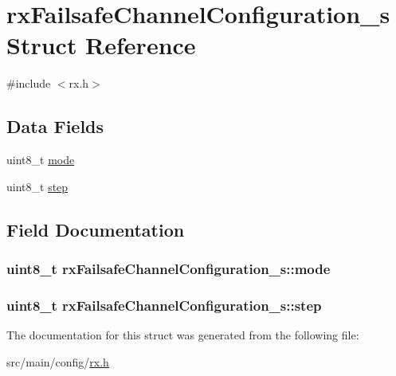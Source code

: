\hypertarget{structrxFailsafeChannelConfiguration__s}{\section{rx\+Failsafe\+Channel\+Configuration\+\_\+s Struct Reference}
\label{structrxFailsafeChannelConfiguration__s}
}


{\ttfamily \#include $<$rx.\+h$>$}

\subsection*{Data Fields}
\begin{DoxyCompactItemize}
\item 
uint8\+\_\+t \hyperlink{structrxFailsafeChannelConfiguration__s_a9d5ef953270de9d92a7bd424d6580b6f}{mode}
\item 
uint8\+\_\+t \hyperlink{structrxFailsafeChannelConfiguration__s_a88eea7a958ac0da378e1f85d0e037f1e}{step}
\end{DoxyCompactItemize}


\subsection{Field Documentation}
\hypertarget{structrxFailsafeChannelConfiguration__s_a9d5ef953270de9d92a7bd424d6580b6f}{
\subsubsection[{mode}]{\setlength{\rightskip}{0pt plus 5cm}uint8\+\_\+t rx\+Failsafe\+Channel\+Configuration\+\_\+s\+::mode}}\label{structrxFailsafeChannelConfiguration__s_a9d5ef953270de9d92a7bd424d6580b6f}
\hypertarget{structrxFailsafeChannelConfiguration__s_a88eea7a958ac0da378e1f85d0e037f1e}{
\subsubsection[{step}]{\setlength{\rightskip}{0pt plus 5cm}uint8\+\_\+t rx\+Failsafe\+Channel\+Configuration\+\_\+s\+::step}}\label{structrxFailsafeChannelConfiguration__s_a88eea7a958ac0da378e1f85d0e037f1e}


The documentation for this struct was generated from the following file\+:\begin{DoxyCompactItemize}
\item 
src/main/config/\hyperlink{config_2rx_8h}{rx.\+h}\end{DoxyCompactItemize}
